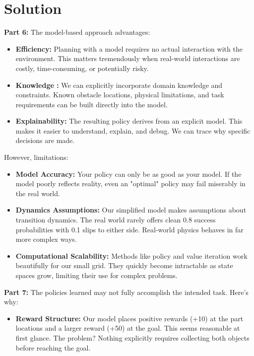 \documentclass[submit]{../harvardml}
\newenvironment{solution}
  {\color{blue}\section*{Solution}}
{}
\begin{document}
\newpage

\begin{solution}
\textbf{Part 6:} The model-based approach advantages:

\begin{itemize}
    \item \textbf{ Efficiency:} Planning with a model requires no actual interaction with the environment. This matters tremendously when real-world interactions are costly, time-consuming, or potentially risky.
        
    \item \textbf{ Knowledge :} We can explicitly incorporate domain knowledge and constraints. Known obstacle locations, physical limitations, and task requirements can be built directly into the model.
    
    \item \textbf{Explainability:} The resulting policy derives from an explicit model. This makes it easier to understand, explain, and debug. We can trace why specific decisions are made.
    
\end{itemize}

However, limitations:

\begin{itemize}
    \item \textbf{Model Accuracy:} Your policy can only be as good as your model. If the model poorly reflects reality, even an "optimal" policy may fail miserably in the real world.
        
    \item \textbf{Dynamics Assumptions:} Our simplified model makes assumptions about transition dynamics. The real world rarely offers clean 0.8 success probabilities with 0.1 slips to either side. Real-world physics behaves in far more complex ways.
    
    \item \textbf{Computational Scalability:} Methods like policy and value iteration work beautifully for our small grid. They quickly become intractable as state spaces grow, limiting their use for complex problems.
    
\end{itemize}

\textbf{Part 7:} The policies learned may not fully accomplish the intended task. Here's why:

\begin{itemize}
    \item \textbf{Reward Structure:} Our model places positive rewards (+10) at the part locations and a larger reward (+50) at the goal. This seems reasonable at first glance. The problem? Nothing explicitly requires collecting both objects before reaching the goal.
    

\end{itemize}
\end{solution}
\end{document}
